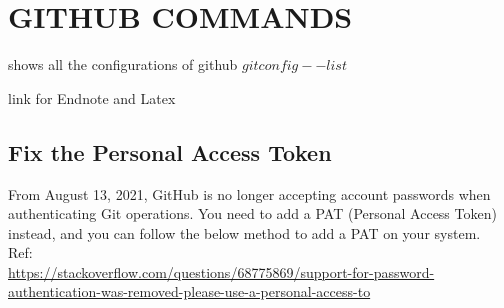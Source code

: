 \section{GITHUB COMMANDS}
shows all the configurations of github
$git config --list$

link for Endnote and Latex

\subsection{Fix the Personal Access Token}
From August 13, 2021, GitHub is no longer accepting account passwords 
when authenticating Git operations. 
You need to add a PAT (Personal Access Token) instead, 
and you can follow the below method to add a PAT on your system.\\

Ref:\\
\url{https://stackoverflow.com/questions/68775869/support-for-password-authentication-was-removed-please-use-a-personal-access-to}\\
    
